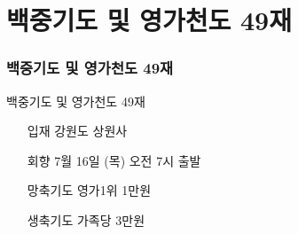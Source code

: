 \documentclass[aspectratio=1610,17pt,xcolor=pdftex,dvipsnames,table,handout]{beamer}
\begin{document}
		\section{백중기도 및 영가천도 49재}
		\begin{frame} [t,plain]
		\frametitle{백중기도 및 영가천도 49재 }
			\begin{block} {백중기도 및 영가천도 49재 }

			\setlength{\leftmargini}{5em}			
			\begin{itemize}
				\item [입재]	 강원도 상원사
				\item [회향]	7월 16일 (목) 오전 7시 출발
				\item [망축기도]	영가1위 1만원
				\item [생축기도]	가족당 3만원
			\end{itemize}

			\end{block}						
		\end{frame}					




\end{document}

